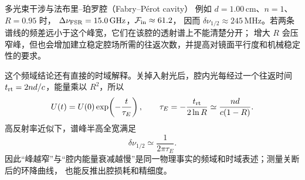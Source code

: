 \begin{starread}{多光束干涉与法布里--珀罗腔（Fabry--P\'erot cavity）}
例如 $d=1.00\,\mathrm{cm}$、$n=1$、$R=0.95$ 时，
$\Delta\nu_{\rm FSR}=15.0\,\mathrm{GHz}$，$\mathcal F_{\rm in}\approx61.2$，
因而 $\delta\nu_{1/2}\approx245\,\mathrm{MHz}$。若两条谱线的频差远小于这个峰宽，它们在该腔的透射谱上不能清楚分开；
增大 $R$ 会压窄峰，但也会增加建立稳定腔场所需的往返次数，并提高对镜面平行度和机械稳定性的要求。

这个频域结论还有直接的时域解释。关掉入射光后，腔内光每经过一个往返时间
$t_{\rm rt}=2nd/c$，能量乘以 $R^2$，所以
\[
 U(t)=U(0)\exp\!\left(-\frac{t}{\tau_E}\right),
 \qquad
 \tau_E=-\frac{t_{\rm rt}}{2\ln R}
 \simeq\frac{nd}{c(1-R)}.
\]
高反射率近似下，谱峰半高全宽满足
\[
 \boxed{\delta\nu_{1/2}\simeq\frac1{2\pi\tau_E}}.
\]
因此“峰越窄”与“腔内能量衰减越慢”是同一物理事实的频域和时域表述；测量关断后的环降曲线，
也能反推出腔损耗和精细度。
\end{starread}



\endgroup